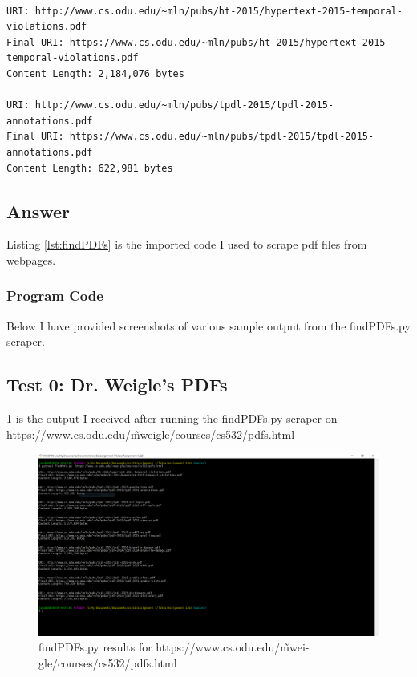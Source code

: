\documentclass[12pt]{article}
\begin{document}
\begin{lstlisting}[numbers=none, caption=Expected Output, label=lst:q3ExpectedOutput]
% python3 findPDFs.py https://www.cs.odu.edu/~mweigle/courses/cs532/pdfs.html

URI: http://www.cs.odu.edu/~mln/pubs/ht-2015/hypertext-2015-temporal-violations.pdf
Final URI: https://www.cs.odu.edu/~mln/pubs/ht-2015/hypertext-2015-temporal-violations.pdf
Content Length: 2,184,076 bytes

URI: http://www.cs.odu.edu/~mln/pubs/tpdl-2015/tpdl-2015-annotations.pdf
Final URI: https://www.cs.odu.edu/~mln/pubs/tpdl-2015/tpdl-2015-annotations.pdf
Content Length: 622,981 bytes
\end{lstlisting}
\pagebreak
\subsection*{Answer}
Listing \ref{lst:findPDFs} is the imported code I used to scrape pdf files from webpages.
\subsubsection*{Program Code}

\pagebreak
Below I have provided screenshots of various sample output from the findPDFs.py scraper. 
\subsection*{Test 0: Dr. Weigle's PDFs} 

\ref{fig:q3ResponseWeigle} is the output I received after running the findPDFs.py scraper on https://www.cs.odu.edu/\~ mweigle/courses/cs532/pdfs.html 
\begin{figure}[H]
    \centering
    \includegraphics[trim=0 50 400 20, clip, width=\textwidth] {Q3/q3_weiglePdfs.png}
    \caption{findPDFs.py results for https://www.cs.odu.edu/\~ mwei-
gle/courses/cs532/pdfs.html}
    \label{fig:q3ResponseWeigle}
\end{figure}
\pagebreak
\end{document}
